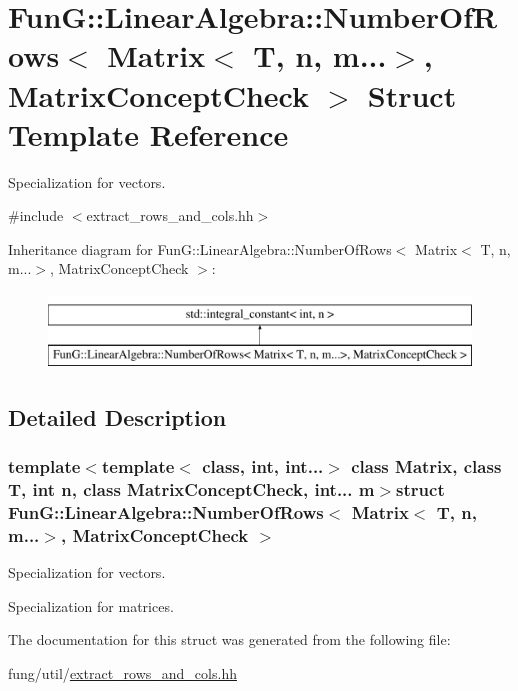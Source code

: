 \hypertarget{structFunG_1_1LinearAlgebra_1_1NumberOfRows_3_01Matrix_3_01T_00_01n_00_01m_8_8_8_4_00_01MatrixConceptCheck_01_4}{}\section{Fun\+G\+:\+:Linear\+Algebra\+:\+:Number\+Of\+Rows$<$ Matrix$<$ T, n, m...$>$, Matrix\+Concept\+Check $>$ Struct Template Reference}
\label{structFunG_1_1LinearAlgebra_1_1NumberOfRows_3_01Matrix_3_01T_00_01n_00_01m_8_8_8_4_00_01MatrixConceptCheck_01_4}


Specialization for vectors.  




{\ttfamily \#include $<$extract\+\_\+rows\+\_\+and\+\_\+cols.\+hh$>$}

Inheritance diagram for Fun\+G\+:\+:Linear\+Algebra\+:\+:Number\+Of\+Rows$<$ Matrix$<$ T, n, m...$>$, Matrix\+Concept\+Check $>$\+:\begin{figure}[H]
\begin{center}
\leavevmode
\includegraphics[height=2.000000cm]{structFunG_1_1LinearAlgebra_1_1NumberOfRows_3_01Matrix_3_01T_00_01n_00_01m_8_8_8_4_00_01MatrixConceptCheck_01_4}
\end{center}
\end{figure}


\subsection{Detailed Description}
\subsubsection*{template$<$template$<$ class, int, int...$>$ class Matrix, class T, int n, class Matrix\+Concept\+Check, int... m$>$struct Fun\+G\+::\+Linear\+Algebra\+::\+Number\+Of\+Rows$<$ Matrix$<$ T, n, m...$>$, Matrix\+Concept\+Check $>$}

Specialization for vectors. 

Specialization for matrices. 

The documentation for this struct was generated from the following file\+:\begin{DoxyCompactItemize}
\item 
fung/util/\hyperlink{extract__rows__and__cols_8hh}{extract\+\_\+rows\+\_\+and\+\_\+cols.\+hh}\end{DoxyCompactItemize}
